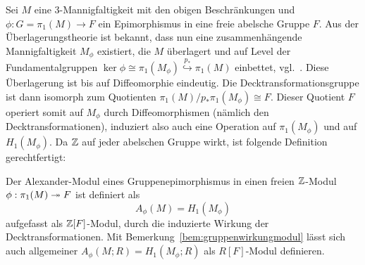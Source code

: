  


    	Sei $M$ eine 3-Mannigfaltigkeit mit den obigen Beschränkungen und $\phi: G=\pi_1(M) \to F$ ein Epimorphismus in eine freie abelsche Gruppe $F$. Aus der Überlagerungstheorie ist bekannt, dass nun eine zusammenhängende Mannigfaltigkeit $ M_\phi$ existiert, die $M$ überlagert und auf Level der Fundamentalgruppen $\ker \phi \cong \pi_1 ( M_\phi) \stackrel{p_*}{\hookrightarrow} \pi_1(M)$ einbettet, vgl.\ \cite[Kapitel~1.3]{Hatcher.2002}. Diese Überlagerung ist bis auf Diffeomorphie eindeutig. Die Decktransformationsgruppe ist dann isomorph zum Quotienten $\pi_1(M)/p_*\pi_1( M_\phi) \cong F$. Dieser Quotient $F$ operiert somit auf $ M_\phi$ durch Diffeomorphismen (nämlich den Decktransformationen), induziert also auch eine Operation auf $\pi_1( M_\phi)$ und auf $H_1( M_\phi)$. Da $\mathbb{Z}$ auf jeder abelschen Gruppe wirkt, ist folgende Definition gerechtfertigt:
    	\begin{defn}
    		Der Alexander-Modul eines Gruppenepimorphismus in einen freien $\mathbb{Z}$-Modul $\phi: \pi_1(M) \twoheadrightarrow F$ ist definiert als
    		\[
    			A_\phi(M) = H_1( M_\phi)
    		\]
    		aufgefasst als $\mathbb{Z}[F]$-Modul, durch die induzierte Wirkung der Decktransformationen. Mit Bemerkung~\ref{bem:gruppenwirkungmodul} lässt sich auch allgemeiner $A_\phi(M;R)= H_1( M_\phi;R)$ als $R[F]$-Modul definieren.
    	\end{defn}

